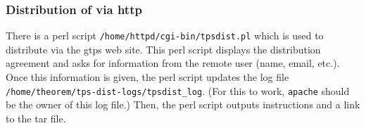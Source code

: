 %
%
%
%
%
%
%
%
%
%

\subsubsection{Distribution of \TPS via http}

There is a perl script {\tt /home/httpd/cgi-bin/tpsdist.pl}
which is used to distribute \TPS via the gtps web site.
This perl script displays the distribution agreement
and asks for information from the remote user (name, email, etc.).
Once this information is given, the perl script updates
the log file {\verb+/home/theorem/tps-dist-logs/tpsdist_log+}.
(For this to work, {\tt apache} should be the owner of this log file.)
Then, the perl script outputs instructions and a link to the tar file.


